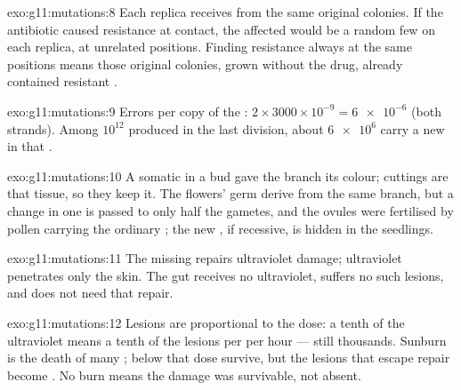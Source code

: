 \begin{solution}{exo:g11:mutations:8}
Each replica receives  from the same original colonies. If the
antibiotic caused resistance at contact, the affected  would be
a random few on each replica, at unrelated positions. Finding
resistance always at the same positions means those original
colonies, grown without the drug, already contained resistant .
\end{solution}

\begin{solution}{exo:g11:mutations:9}
Errors per copy of the : $2 \times 3000 \times 10^{-9} =
\num{6e-6}$ (both strands). Among $10^{12}$  produced in the last
division, about $\num{6e6}$ carry a new  in that .
\end{solution}

\begin{solution}{exo:g11:mutations:10}
A somatic  in a bud  gave the branch its colour; cuttings
are that tissue, so they keep it. The flowers' germ  derive from
the same branch, but a change in one  is passed to only half
the gametes, and the ovules were fertilised by pollen carrying the
ordinary ; the new , if recessive, is hidden in the
seedlings.
\end{solution}

\begin{solution}{exo:g11:mutations:11}
The missing  repairs ultraviolet damage; ultraviolet penetrates
only the skin. The gut receives no ultraviolet, suffers no such
lesions, and does not need that repair.
\end{solution}

\begin{solution}{exo:g11:mutations:12}
Lesions are proportional to the dose: a tenth of the ultraviolet means
a tenth of the lesions per  per hour --- still thousands. Sunburn
is the death of many ; below that dose  survive, but the
lesions that escape repair become . No burn means the damage
was survivable, not absent.
\end{solution}

